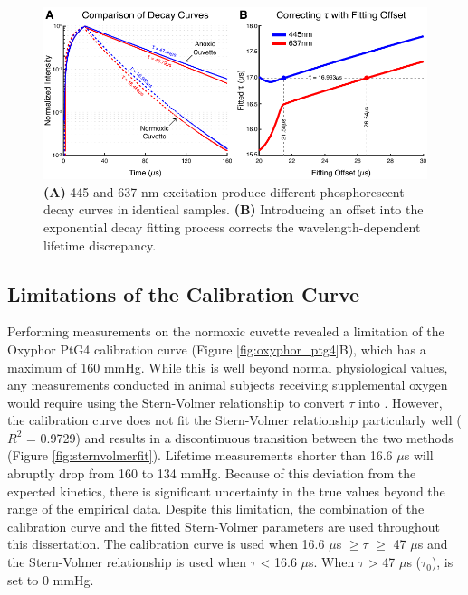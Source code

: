 \begin{figure}
    \includegraphics{figures/chapter_2/offsetcorrection.pdf}
    \caption {
        \label{fig:offsetcorrection}
        \textbf{(A)} 445 and 637 nm excitation produce different phosphorescent decay curves in identical samples. \textbf{(B)} Introducing an offset into the exponential decay fitting process corrects the wavelength-dependent lifetime discrepancy.
    }
\end{figure}

\subsection{Limitations of the Calibration Curve}

Performing measurements on the normoxic cuvette revealed a limitation of the Oxyphor PtG4 calibration curve (Figure \ref{fig:oxyphor_ptg4}B), which has a maximum  of 160 mmHg. While this is well beyond normal physiological values, any measurements conducted in animal subjects receiving supplemental oxygen would require using the Stern-Volmer relationship to convert $\tau$ into . However, the calibration curve does not fit the Stern-Volmer relationship particularly well ($R^2$ = 0.9729) and results in a discontinuous transition between the two methods (Figure \ref{fig:sternvolmerfit}). Lifetime measurements shorter than 16.6 $\mu$s will abruptly drop from 160 to 134 mmHg. Because of this deviation from the expected kinetics, there is significant uncertainty in the true  values beyond the range of the empirical data. Despite this limitation, the combination of the calibration curve and the fitted Stern-Volmer parameters are used throughout this dissertation. The calibration curve is used when 16.6 $\mu$s $\ge \tau$ $\ge$ 47 $\mu$s and the Stern-Volmer relationship is used when $\tau$ \textless{} 16.6 $\mu$s. When $\tau$ \textgreater{} 47 $\mu$s ($\tau_0$),  is set to 0 mmHg.

